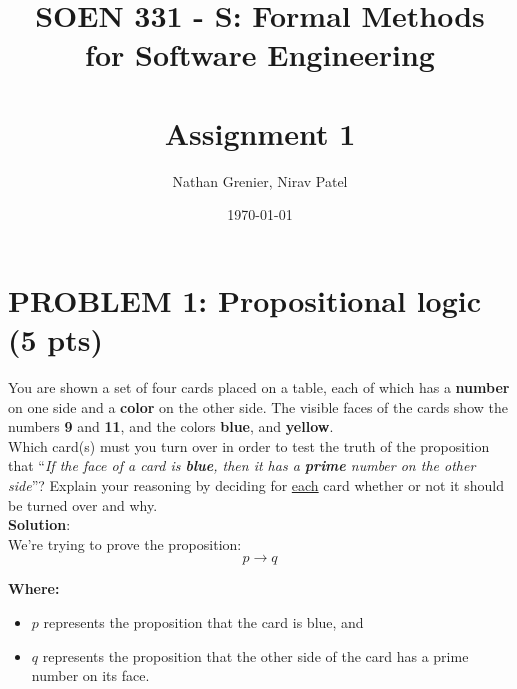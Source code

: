 \documentclass[12pt]{article}
\title{SOEN 331 - S: Formal Methods\\for Software Engineering\\
\ \\
Assignment 1}
\author{Nathan Grenier, Nirav Patel}
\date{\today}
\begin{document}
\maketitle
\thispagestyle{empty}

\newpage

							    
\section*{PROBLEM 1: Propositional logic (5 pts)}


You are shown a set of four cards placed on a table, each of which has a \textbf{number} on one
side and a \textbf{color} on the other side. The visible faces of the cards show the numbers \textbf{9} and
\textbf{11}, and the colors \textbf{blue}, and \textbf{yellow}.\\
										
Which card(s) must you turn over in order to test the truth of the proposition that “\textit{If
the face of a card is \textbf{blue}, then it has a \textbf{prime} number on the other side}”? Explain your
reasoning by deciding for \underline{each} card whether or not it should be turned over and why.\\
\textbf{Solution}: 
\\
We're trying to prove the proposition: $$p \rightarrow q$$

\textbf{Where:} 
\begin{itemize}
	\item $p$ represents the proposition that the card is blue, and
	\item $q$ represents the proposition that the other side of the card has a prime number on its face.
\end{itemize}
\end{document}
